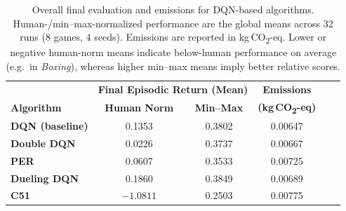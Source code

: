 \begin{table}
	\caption{Overall final evaluation and emissions for DQN-based algorithms. 
		Human-/min--max-normalized performance are the global means across 32 runs (8 games, 4 seeds). 
		Emissions are reported in kg\,CO\textsubscript{2}-eq. 
		Lower or negative human-norm means indicate below-human performance on average (e.g.\ in \emph{Boxing}), 
		whereas higher min--max means imply better relative scores.}
	\label{tab:dqn_overall}
	\centering
	\begin{tabular}{lccccc}
		\toprule
		& \multicolumn{2}{c}{\textbf{Final Episodic Return (Mean)}} & 
		\multicolumn{1}{c}{\textbf{Emissions}} \\
		\cmidrule(lr){2-3} \cmidrule(lr){4-4}
		\textbf{Algorithm} & \textbf{Human Norm} & \textbf{Min--Max} & \textbf{(kg\,CO\textsubscript{2}-eq)} \\
		\midrule
		\textbf{DQN (baseline)} & 0.1353 & 0.3802 & 0.00647 \\
		\textbf{Double DQN}     & 0.0226 & 0.3737 & 0.00667 \\
		\textbf{PER}            & 0.0607 & 0.3533 & 0.00725 \\
		\textbf{Dueling DQN}    & 0.1860 & 0.3849 & 0.00689 \\
		\textbf{C51}            & $-1.0811$ & 0.2503 & 0.00775 \\
		\bottomrule
	\end{tabular}
\end{table}

